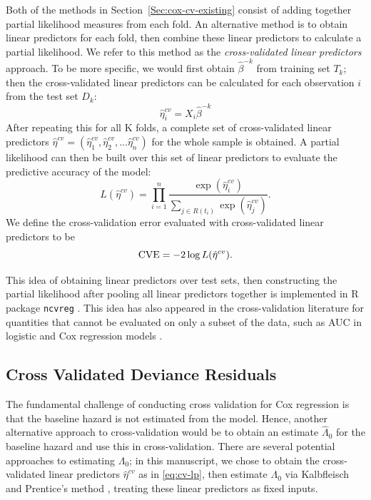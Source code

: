 \par Both of the methods in Section~\ref{Sec:cox-cv-existing} consist of adding together partial likelihood measures from each fold.  An alternative method is to obtain linear predictors for each fold, then combine these linear predictors to calculate a partial likelihood. We refer to this method as the \emph{cross-validated linear predictors} approach. To be more specific, we would first obtain $\hat{\beta}^{-k}$ from training set $T_{k}$; then the cross-validated linear predictors can be calculated for each observation $i$ from the test set $D_k$:  
\begin{equation}
  \label{eq:cv-lp}
  \hat{\eta}^{cv}_{i} = X_{i}\hat{\beta}^{-k}
\end{equation} 
After repeating this for all K folds, a complete set of cross-validated linear predictors $\hat{\eta}^{cv} = ( \hat{\eta}^{cv}_{1},  \hat{\eta}^{cv}_{2} , ...  \hat{\eta}^{cv}_{n})$ for the whole sample is obtained. A partial likelihood can then be built over this set of linear predictors to evaluate the predictive accuracy of the model: 
	\begin{equation} 
	L(\hat{\eta}^{cv}) = \prod_{i=1}^{n} \frac{\exp (\hat{\eta}^{cv}_{i})}{\sum_{ j \in R(t_{i})}\exp (\hat{\eta}^{cv}_{j})}.
	\end{equation}
We define the cross-validation error evaluated with cross-validated linear predictors to be $$\textrm{CVE} = - 2 \log L(\hat{\eta}^{cv}).$$
  
\par This idea of obtaining linear predictors over test sets, then constructing the partial likelihood after pooling all linear predictors together is implemented in R package \texttt{ncvreg} \citep{ncvreg}. This idea has also appeared in the cross-validation literature for quantities that cannot be evaluated on only a subset of the data, such as AUC in logistic and Cox regression models \citep{Parker2007,Simon2011a,Subramanian2011}.

\subsection{Cross Validated Deviance Residuals}

The fundamental challenge of conducting cross validation for Cox regression is that the baseline hazard is not estimated from the model. Hence, another alternative approach to cross-validation would be to obtain an estimate $\hat{\Lambda}_{0}$ for the baseline hazard and use this in cross-validation.  There are several potential approaches to estimating $\Lambda_0$; in this manuscript, we chose to obtain the cross-validated linear predictors $\hat{\eta}^{cv}$ as in \eqref{eq:cv-lp}, then estimate $\Lambda_0$ via Kalbfleisch and Prentice's method \citep{Kalbfleisch2011}, treating these linear predictors as fixed inputs.


